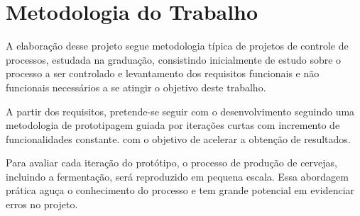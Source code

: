 \chapter{Metodologia do Trabalho}

A elaboração desse projeto segue metodologia típica de projetos de controle de
processos, estudada na graduação, consistindo inicialmente de estudo sobre o
processo a ser controlado e levantamento dos requisitos funcionais e não funcionais
necessários a se atingir o objetivo deste trabalho.


A partir dos requisitos, pretende-se seguir com o desenvolvimento seguindo uma
metodologia de prototipagem guiada por iterações curtas com incremento de
funcionalidades constante. com o objetivo de acelerar a obtenção de
resultados.


Para avaliar cada iteração do protótipo, o processo de produção de cervejas,
incluindo a fermentação, será reproduzido em pequena escala. Essa abordagem prática 
aguça o conhecimento do processo e tem grande potencial em evidenciar erros no projeto.
